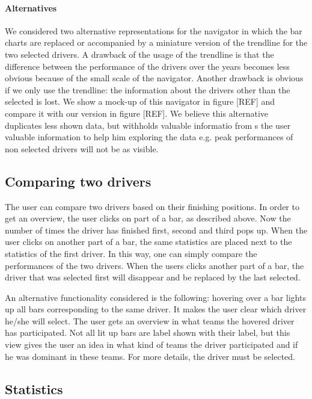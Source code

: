 \documentclass{sigchi}
\begin{document}
\paragraph{Alternatives}
We considered two alternative representations for the navigator in which the bar charts are replaced or accompanied by a miniature version of the trendline for the two selected drivers. A drawback of the usage of the trendline is that the difference between the performance of the drivers over the years becomes less obvious because of the small scale of the navigator. Another drawback is obvious if we only use the trendline: the information about the drivers other than the selected is lost.
 We show a mock-up of this navigator in figure [REF] and compare it with our version in figure [REF]. We believe this alternative duplicates less shown data, but withholds valuable informatio from s the user  valuable information to help him exploring the data e.g. peak performances of non selected drivers will not be as visible.


\subsection{Comparing two drivers}
The user can compare two drivers based on their finishing positions. In order to get an overview, the user clicks on part of a bar, as described above. Now the number of times the driver has finished first, second and third pops up. When the user clicks on another part of a bar, the same statistics are placed next to the statistics of the first driver. In this way, one can simply compare the performances of the two drivers. When the users clicks another part of a bar, the driver that was selected first will disappear and be replaced by the last selected.

An alternative functionality considered is the following: hovering over a bar lights up all bars corresponding to the same driver. It makes the user clear which driver he/she will select. The user gets an overview in what teams the hovered driver has participated. Not all lit up bars are label shown with their label, but this view gives the user an idea in what kind of teams the driver participated and if he was dominant in these teams. For more details, the driver must be selected.

\subsection{Statistics}
\end{document}
